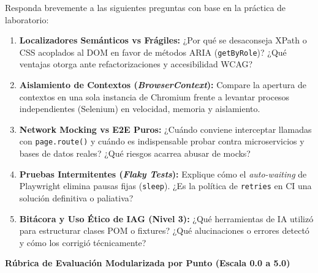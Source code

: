 \documentclass[10pt,letterpaper]{article}
\newcommand{\sectionBadge}[1]{%
  \refstepcounter{section}%
  \vspace{0.16cm}%
  \noindent%
  \colorbox{icesiBlue}{\color{white}\rule[-0.08cm]{0pt}{0.42cm}\hspace{0.16cm}\textbf{\normalsize \thesection}\hspace{0.16cm}}%
  \hspace{0.18cm}%
  {\fontsize{9.5}{12}\selectfont\textbf{\color{icesiDark}#1}}\\[-0.10cm]%
  \noindent{\color{icesiDark}\rule{\textwidth}{0.8pt}}\vspace{0.06cm}%
}
\begin{document}
Responda brevemente a las siguientes preguntas con base en la práctica de laboratorio:
\begin{enumerate}[leftmargin=*,label=\textbf{\arabic*.},itemsep=2pt,topsep=1.5pt]
  \item \textbf{Localizadores Semánticos vs Frágiles:} ¿Por qué se desaconseja XPath o CSS acoplados al DOM en favor de métodos ARIA (\texttt{getByRole})? ¿Qué ventajas otorga ante refactorizaciones y accesibilidad WCAG?
  \item \textbf{Aislamiento de Contextos (\textit{BrowserContext}):} Compare la apertura de contextos en una sola instancia de Chromium frente a levantar procesos independientes (Selenium) en velocidad, memoria y aislamiento.
  \item \textbf{Network Mocking vs E2E Puros:} ¿Cuándo conviene interceptar llamadas con \texttt{page.route()} y cuándo es indispensable probar contra microservicios y bases de datos reales? ¿Qué riesgos acarrea abusar de mocks?
  \item \textbf{Pruebas Intermitentes (\textit{Flaky Tests}):} Explique cómo el \textit{auto-waiting} de Playwright elimina pausas fijas (\texttt{sleep}). ¿Es la política de \texttt{retries} en CI una solución definitiva o paliativa?
  \item \textbf{Bitácora y Uso Ético de IAG (Nivel 3):} ¿Qué herramientas de IA utilizó para estructurar clases POM o fixtures? ¿Qué alucinaciones o errores detectó y cómo los corrigió técnicamente?
\end{enumerate}

\newpage

\sectionBadge{Rúbrica de Evaluación Modularizada por Punto (Escala 0.0 a 5.0)}
\end{document}
